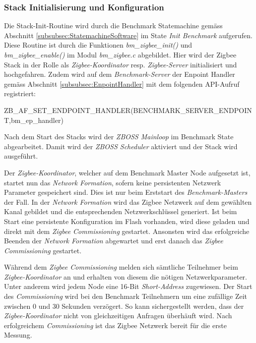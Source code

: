 \subsubsection{Stack Initialisierung und Konfiguration}\label{subsubsec:ZigbeeStackInitundKonfiguration}
Die Stack-Init-Routine wird durch die Benchmark Statemachine gemäss Abschnitt \ref{subsubsec:StatemachineSoftware} im State \textit{Init Benchmark} aufgerufen.
Diese Routine ist durch die Funktionen \textit{bm\_zigbee\_init()} und \textit{bm\_zigbee\_enable()} im Modul \textit{bm\_zigbee.c} abgebildet.
Hier wird der Zigbee Stack in der Rolle als \textit{Zigbee-Koordinator} resp. \textit{Zigbee-Server} initialisiert und hochgefahren.
Zudem wird auf dem \textit{Benchmark-Server} der Enpoint Handler gemäss Abschnitt \ref{subsubsec:EnpointHandler} mit dem folgenden API-Aufruf registriert:

ZB\_AF\_SET\_ENDPOINT\_HANDLER(BENCHMARK\_SERVER\_ENDPOINT,\linebreak bm\_ep\_handler)

Nach dem Start des Stacks wird der \textit{ZBOSS Mainloop} im Benchmark State abgearbeitet. Damit wird der \textit{ZBOSS Scheduler} aktiviert und der Stack wird ausgeführt.

Der \textit{Zigbee-Koordinator}, welcher auf dem Benchmark Master Node aufgesetzt ist, startet nun das \textit{Network Formation}, sofern keine persistenten Netzwerk Parameter gespeichert sind.
Dies ist nur beim Erststart des \textit{Benchmark-Masters} der Fall.
In der \textit{Network Formation} wird das Zigbee Netzwerk auf dem gewählten Kanal gebildet und die entsprechenden Netzwerkschlüssel generiert.
Ist beim Start eine persistente Konfiguration im Flash vorhanden, wird diese geladen und direkt mit dem \textit{Zigbee Commissioning} gestartet.
Ansonsten wird das erfolgreiche Beenden der \textit{Network Formation} abgewartet und erst danach das \textit{Zigbee Commissioning} gestartet.

Während dem \textit{Zigbee Commissioning} melden sich sämtliche Teilnehmer beim \textit{Zigbee-Koordinator} an und erhalten von diesem die nötigen Netzwerkparameter.
Unter anderem wird jedem Node eine 16-Bit \textit{Short-Address} zugewiesen.
Der Start des \textit{Commissioning} wird bei den Benchmark Teilnehmern um eine zufällige Zeit zwischen 0 und 30 Sekunden verzögert.
So kann sichergestellt werden, dass der \textit{Zigbee-Koordinator} nicht von gleichzeitigen Anfragen überhäuft wird.
Nach erfolgreichem \textit{Commissioning} ist das Zigbee Netzwerk bereit für die erste Messung.

